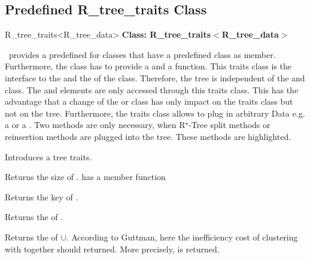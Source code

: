 \subsection{Predefined R\_tree\_traits Class}
\label{Rtreetraitspre}
\begin{ccClassTemplate}{R_tree_traits<R_tree_data>}
\noindent
{\bf Class: R\_tree\_traits$<$R\_tree\_data$>$}

\cgal\  provides a predefined  for 
classes that have a predefined  class as
member. Furthermore, the  class has to provide a 
and a  function.
This traits class is  the interface to the  and the 
 of the  class. Therefore, the tree is
independent of the  and 
 class. The  and 
 elements are only accessed through this traits
class. This has the advantage that a change of the  or 
 class has only impact on the traits class but not on
the tree. Furthermore, the traits class allows to plug in  arbitrary Data e.g. 
a  or a
. 
Two methods are only necessary, when  R$^\star$-Tree
split methods or reinsertion methods are plugged into the
tree. These methods are highlighted.






\ccTypes
{}


\ccCreation

{Introduces a tree traits.}

\ccOperations

{Returns the size of . 
\ccPrecond {} has a member function }

{Returns the key of .}

{Returns the  of .}

{Returns the  of $\cup$. According to
  Guttman, here the inefficiency cost of clustering  with
   together
  should returned. More precisely,
   is returned.}



\end{ccClassTemplate}
